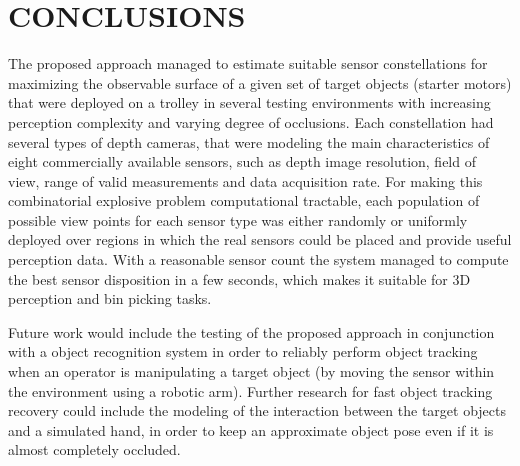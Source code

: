 \section{\uppercase{Conclusions}}\label{sec:conclusions}

\noindent The proposed approach managed to estimate suitable sensor constellations for maximizing the observable surface of a given set of target objects (starter motors) that were deployed on a trolley in several testing environments with increasing perception complexity and varying degree of occlusions. Each constellation had several types of depth cameras, that were modeling the main characteristics of eight commercially available sensors, such as depth image resolution, field of view, range of valid measurements and data acquisition rate. For making this combinatorial explosive problem computational tractable, each population of possible view points for each sensor type was either randomly or uniformly deployed over regions in which the real sensors could be placed and provide useful perception data. With a reasonable sensor count the system managed to compute the best sensor disposition in a few seconds, which makes it suitable for 3D perception and bin picking tasks.

Future work would include the testing of the proposed approach in conjunction with a object recognition system in order to reliably perform object tracking when an operator is manipulating a target object (by moving the sensor within the environment using a robotic arm). Further research for fast object tracking recovery could include the modeling of the interaction between the target objects and a simulated hand, in order to keep an approximate object pose even if it is almost completely occluded.
